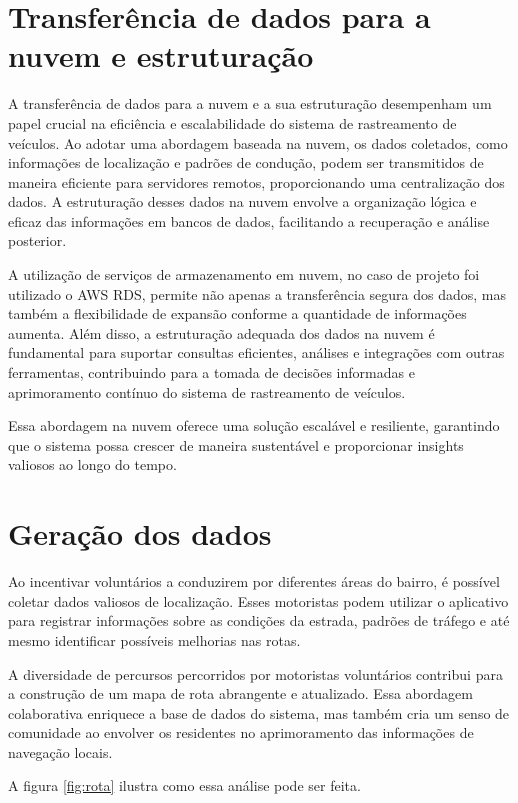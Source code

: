 \section{Transferência de dados para a nuvem e estruturação}

A transferência de dados para a nuvem e a sua estruturação desempenham um papel crucial na eficiência e escalabilidade do sistema de rastreamento de veículos. Ao adotar uma abordagem baseada na nuvem, os dados coletados, como informações de localização e padrões de condução, podem ser transmitidos de maneira eficiente para servidores remotos, proporcionando uma centralização dos dados. A estruturação desses dados na nuvem envolve a organização lógica e eficaz das informações em bancos de dados, facilitando a recuperação e análise posterior. 

A utilização de serviços de armazenamento em nuvem, no caso de projeto foi utilizado o AWS RDS, permite não apenas a transferência segura dos dados, mas também a flexibilidade de expansão conforme a quantidade de informações aumenta. Além disso, a estruturação adequada dos dados na nuvem é fundamental para suportar consultas eficientes, análises e integrações com outras ferramentas, contribuindo para a tomada de decisões informadas e aprimoramento contínuo do sistema de rastreamento de veículos. 

Essa abordagem na nuvem oferece uma solução escalável e resiliente, garantindo que o sistema possa crescer de maneira sustentável e proporcionar insights valiosos ao longo do tempo.

\section{Geração dos dados}
Ao incentivar voluntários a conduzirem por diferentes áreas do bairro, é possível coletar dados valiosos de localização. Esses motoristas podem utilizar o aplicativo para registrar informações sobre as condições da estrada, padrões de tráfego e até mesmo identificar possíveis melhorias nas rotas. 

A diversidade de percursos percorridos por motoristas voluntários contribui para a construção de um mapa de rota abrangente e atualizado. Essa abordagem colaborativa enriquece a base de dados do sistema, mas também cria um senso de comunidade ao envolver os residentes no aprimoramento das informações de navegação locais. 

A figura \ref{fig:rota} ilustra como essa análise pode ser feita.

